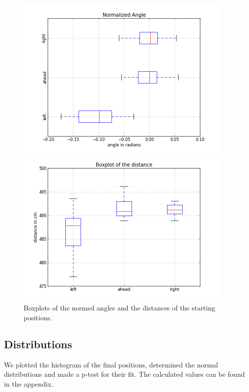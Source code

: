 \documentclass{scrartcl}
\begin{document}
\begin{figure}[H]
\centering
\begin{minipage}{.5\textwidth}
  \centering
  \includegraphics[width=.8\linewidth]{img/BoxplotAngleNorm_s.png}
\end{minipage}%
\begin{minipage}{.5\textwidth}
  \centering
  \includegraphics[width=.8\linewidth]{img/BoxplotDistance_s.png}
\end{minipage}
\caption{Boxplots of the normed angles and the distances of the starting positions.}
\label{fig:right}
\end{figure}



\subsection{Distributions}
We plotted the histogram of the final positions, determined the normal distributions and made a p-test for their fit. The calculated values can be found in the appendix.
\end{document}

